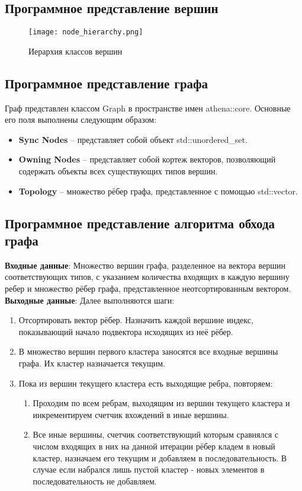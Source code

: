 \subsection{Программное представление вершин}
\label{sec:softwarepresentationnodes}
\begin{figure}[ht]
    \centering
    \texttt{[image: node\_hierarchy.png]}
    \caption{Иерархия классов вершин}
    \label{fig:nodes_hierarchy}
\end{figure}
\subsection{Программное представление графа}
\label{sec:softwarepresentationgraph}
Граф представлен классом Graph в пространстве имен athena::core. Основные его поля выполнены следующим образом:
\begin{itemize}
    \item \textbf{Sync Nodes} -- представляет собой объект std::unordered\_set.
    \item \textbf{Owning Nodes} -- представляет собой кортеж векторов, позволяющий содержать объекты всех существующих типов вершин.
    \item \textbf{Topology} -- множество рёбер графа, представленное с помощью std::vector.
\end{itemize}
\subsection{Программное представление алгоритма обхода графа}
\label{sec:softwarepresentationgraph}
\textbf{Входные данные}: 
Множество вершин графа, разделенное на вектора вершин соответствующих типов, с указанием количества входящих в каждую вершину ребер и множество рёбер графа, представленное неотсортированным вектором. \newline
\textbf{Выходные данные}: 
Далее выполняются шаги:
\begin{enumerate}
    \item Отсортировать вектор рёбер. Назначить каждой вершине индекс, показывающий начало подвектора исходящих из неё рёбер.
    \item В множество вершин первого кластера заносятся все входные вершины графа. Их кластер назначается текущим.
    \item Пока из вершин текущего кластера есть выходящие ребра, повторяем:
    \begin{enumerate}
        \item Проходим по всем ребрам, выходящим из вершин текущего кластера и инкрементируем счетчик вхождений в иные вершины.
        \item Все иные вершины, счетчик соответствующий которым сравнялся с числом входящих в них на данной итерации рёбер кладем в новый кластер, назначаем его текущим и добавляем в последовательность. В случае если набрался лишь пустой кластер - новых элементов в последовательность не добавляем.
    \end{enumerate}
\end{enumerate}
